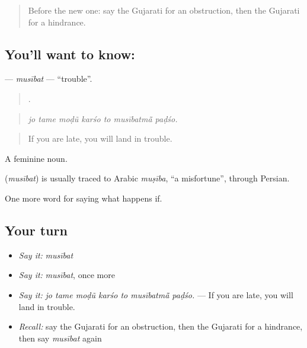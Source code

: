 \label{lesson:GU-C374-musibat}



\begin{quote}
Before the new one: say the Gujarati for an obstruction, then the Gujarati for a hindrance.
\end{quote}

\subsection*{You'll want to know: }
\textbf{} — \emph{musībat} — \textquotedblleft{}trouble\textquotedblright{}.

\begin{quote}
      .
\end{quote}

\begin{quote}
\emph{jo tame moḍũ karśo to musībatmā̃ paḍśo.}
\end{quote}

\begin{quote}
If you are late, you will land in trouble.
\end{quote}

A feminine noun.

\begin{cousinweb}
\textbf{} (\emph{musībat}) is usually traced to Arabic \emph{muṣība}, \textquotedblleft{}a misfortune\textquotedblright{}, through Persian.
\end{cousinweb}

\begin{grammarlens}[title={What you've built}]
One more word for saying what happens if.
\end{grammarlens}

\subsection*{Your turn}
\begin{itemize}
\raggedright
  \item \emph{Say it:} \emph{musībat}
  \item \emph{Say it:} \emph{musībat}, once more
  \item \emph{Say it:} \emph{jo tame moḍũ karśo to musībatmā̃ paḍśo.} — If you are late, you will land in trouble.
  \item \emph{Recall:} say the Gujarati for an obstruction, then the Gujarati for a hindrance, then say \emph{musībat} again
\end{itemize}


